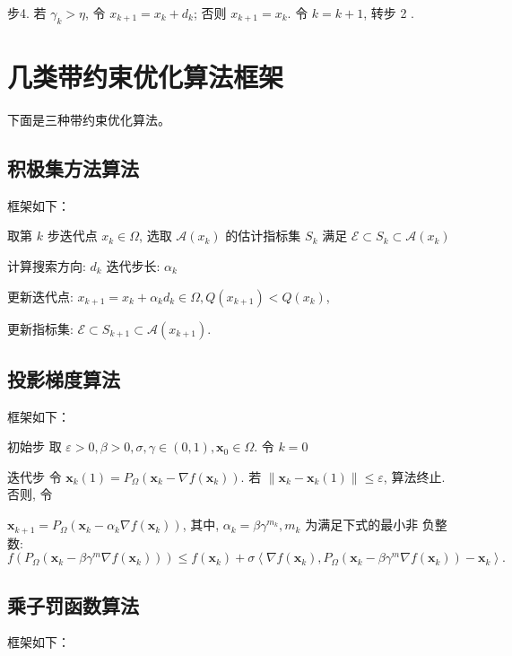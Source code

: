 步4. 若 $\gamma_{k}>\eta$, 令 $x_{k+1}=x_{k}+d_{k}$; 否则 $x_{k+1}=x_{k}$. 令 $k=k+1$, 转步 2 .

\section{几类带约束优化算法框架}
下面是三种带约束优化算法\cite{王宜举2016非线性最优化理论与方法}。
\subsection{积极集方法算法}
框架如下：

取第 $k$ 步迭代点 $x_{k} \in \Omega$, 选取 $\mathcal{A}\left(x_{k}\right)$ 的估计指标集 $S_{k}$ 满足 $\mathcal{E} \subset S_{k} \subset \mathcal{A}\left(x_{k}\right)$

计算搜索方向: $d_{k}$ 迭代步长: $\alpha_{k}$

更新迭代点: $x_{k+1}=x_{k}+\alpha_{k} d_{k} \in \Omega, Q\left(x_{k+1}\right)<Q\left(x_{k}\right)$,

更新指标集: $\mathcal{E} \subset S_{k+1} \subset \mathcal{A}\left(x_{k+1}\right)$.

\subsection{投影梯度算法}
框架如下：

初始步 取 $\varepsilon>0, \beta>0, \sigma, \gamma \in(0,1), \boldsymbol{x}_{0} \in \Omega$. 令 $k=0$

迭代步 令 $\boldsymbol{x}_{k}(1)=P_{\Omega}\left(\boldsymbol{x}_{k}-\nabla f\left(\boldsymbol{x}_{k}\right)\right)$. 若 $\left\|\boldsymbol{x}_{k}-\boldsymbol{x}_{k}(1)\right\| \leqslant \varepsilon$, 算法终止. 否则, 令 

$\boldsymbol{x}_{k+1}=P_{\Omega}\left(\boldsymbol{x}_{k}-\alpha_{k} \nabla f\left(\boldsymbol{x}_{k}\right)\right)$, 其中, $\alpha_{k}=\beta \gamma^{m_{k}}, m_{k}$ 为满足下式的最小非 负整数:
$$
f\left(P_{\Omega}\left(\boldsymbol{x}_{k}-\beta \gamma^{m} \nabla f\left(\boldsymbol{x}_{k}\right)\right)\right) \leqslant f\left(\boldsymbol{x}_{k}\right)+\sigma\left\langle\nabla f\left(\boldsymbol{x}_{k}\right), P_{\Omega}\left(\boldsymbol{x}_{k}-\beta \gamma^{m} \nabla f\left(\boldsymbol{x}_{k}\right)\right)-\boldsymbol{x}_{k}\right\rangle .
$$
\subsection{乘子罚函数算法}
框架如下：

